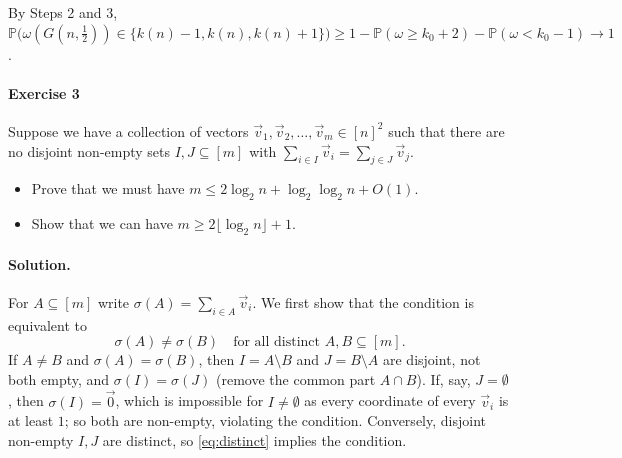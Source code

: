 \documentclass[a4paper,12pt]{article}
\newcommand{\mb}[1]{\mathbb{#1}}
\begin{document}
By Steps 2 and 3, $\mb P\big( \omega(G(n, \frac12)) \in \{ k(n) - 1, k(n), k(n) + 1 \} \big) \ge 1 - \mb P(\omega \ge k_0 + 2) - \mb P(\omega < k_0 - 1) \to 1$.

\paragraph{Exercise 3}  Suppose we have a collection of vectors $\vec{v}_1, \vec{v}_2, \hdots, \vec{v}_m \in [n]^2$ such that there are no disjoint non-empty sets $I, J \subseteq [m]$ with $\sum_{i \in I} \vec{v}_i = \sum_{j \in J} \vec{v}_j$.
\begin{itemize}
	\item[(a)] Prove that we must have $m \le 2 \log_2 n + \log_2 \log_2 n + O(1)$.
	\item[(b)] Show that we can have $m \ge 2 \lfloor \log_2 n \rfloor + 1$.
\end{itemize}

\paragraph{Solution.} For $A \subseteq [m]$ write $\sigma(A) = \sum_{i \in A} \vec v_i$. We first show that the condition is equivalent to
\begin{equation}
	\sigma(A) \neq \sigma(B) \quad \text{for all distinct } A, B \subseteq [m]. \label{eq:distinct} \tag{2}
\end{equation}
If $A \neq B$ and $\sigma(A) = \sigma(B)$, then $I = A \setminus B$ and $J = B \setminus A$ are disjoint, not both empty, and $\sigma(I) = \sigma(J)$ (remove the common part $A \cap B$). If, say, $J = \emptyset$, then $\sigma(I) = \vec 0$, which is impossible for $I \neq \emptyset$ as every coordinate of every $\vec v_i$ is at least $1$; so both are non-empty, violating the condition. Conversely, disjoint non-empty $I, J$ are distinct, so \eqref{eq:distinct} implies the condition.
\end{document}
